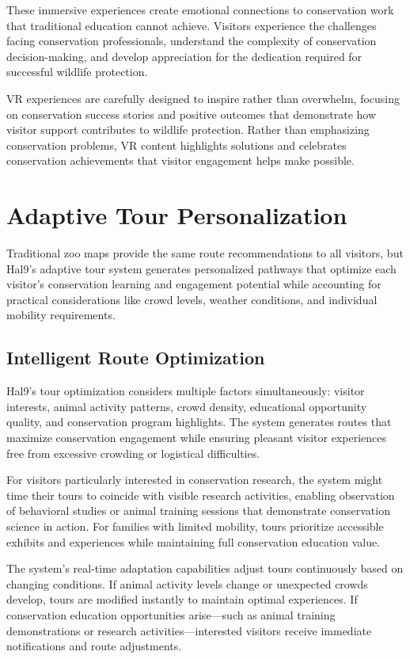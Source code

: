 \documentclass[
  Letterpaper,
]{scrbook}
\begin{document}
These immersive experiences create emotional connections to conservation
work that traditional education cannot achieve. Visitors experience the
challenges facing conservation professionals, understand the complexity
of conservation decision-making, and develop appreciation for the
dedication required for successful wildlife protection.

VR experiences are carefully designed to inspire rather than overwhelm,
focusing on conservation success stories and positive outcomes that
demonstrate how visitor support contributes to wildlife protection.
Rather than emphasizing conservation problems, VR content highlights
solutions and celebrates conservation achievements that visitor
engagement helps make possible.

\section{Adaptive Tour
Personalization}\label{adaptive-tour-personalization}

Traditional zoo maps provide the same route recommendations to all
visitors, but Hal9's adaptive tour system generates personalized
pathways that optimize each visitor's conservation learning and
engagement potential while accounting for practical considerations like
crowd levels, weather conditions, and individual mobility requirements.

\subsection{Intelligent Route
Optimization}\label{intelligent-route-optimization}

Hal9's tour optimization considers multiple factors simultaneously:
visitor interests, animal activity patterns, crowd density, educational
opportunity quality, and conservation program highlights. The system
generates routes that maximize conservation engagement while ensuring
pleasant visitor experiences free from excessive crowding or logistical
difficulties.

For visitors particularly interested in conservation research, the
system might time their tours to coincide with visible research
activities, enabling observation of behavioral studies or animal
training sessions that demonstrate conservation science in action. For
families with limited mobility, tours prioritize accessible exhibits and
experiences while maintaining full conservation education value.

The system's real-time adaptation capabilities adjust tours continuously
based on changing conditions. If animal activity levels change or
unexpected crowds develop, tours are modified instantly to maintain
optimal experiences. If conservation education opportunities
arise---such as animal training demonstrations or research
activities---interested visitors receive immediate notifications and
route adjustments.
\end{document}
